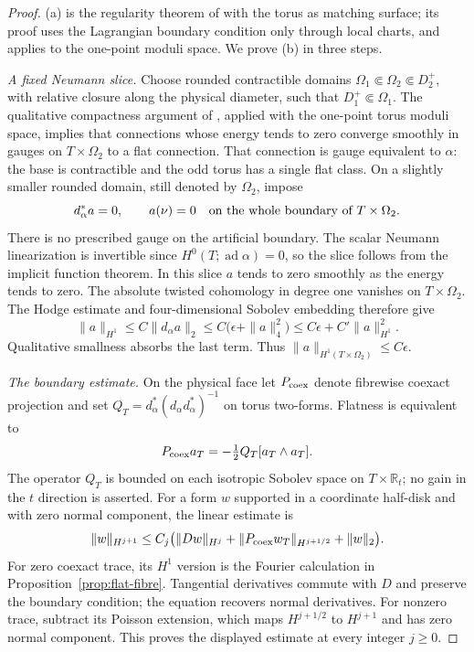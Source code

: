 \documentclass[11pt]{amsart}
\theoremstyle{definition}
\theoremstyle{remark}
\theoremstyle{plain}
\numberwithin{equation}{section}
\newcommand{\RR}{\mathbb{R}}
\newcommand{\ad}{\operatorname{ad}}
\begin{document}
\begin{proof}
(a) is the regularity theorem of \cite[Theorem~1]{DFL-mixed} with the torus as
matching surface; its proof uses the Lagrangian boundary condition only through
local charts, and applies to the one-point moduli space. We prove (b) in three steps.

\emph{A fixed Neumann slice.} Choose rounded contractible domains
$\Omega_1\Subset\Omega_2\Subset D^+_2$, with relative closure along
the physical diameter, such that $D^+_1\Subset\Omega_1$.
The qualitative compactness argument of
\cite[Theorem~4.2, Lemma~4.25 and pp.~38--39]{DFL-mixed}, applied
with the one-point torus moduli space, implies that connections
whose energy tends to zero converge smoothly in gauges on
$T\times\Omega_2$ to a flat connection. That connection is gauge
equivalent to $\alpha$: the base is contractible and the odd torus
has a single flat class. On a slightly smaller rounded domain,
still denoted by $\Omega_2$, impose
\[
d_\alpha^*a=0,\qquad a(\nu)=0
       \quad\hbox{on the whole boundary of }T\times\Omega_2.
\]
There is no prescribed gauge on the artificial boundary. The scalar
Neumann linearization is invertible since $H^0(T;\ad\alpha)=0$,
so the slice follows from the implicit function theorem. In this
slice $a$ tends to zero smoothly as the energy tends to zero.
The absolute twisted cohomology in degree one vanishes on
$T\times\Omega_2$. The Hodge estimate and four-dimensional
Sobolev embedding therefore give
\[
\|a\|_{H^1}\le C\|d_\alpha a\|_2
 \le C\bigl(\epsilon+\|a\|_4^2\bigr)
 \le C\epsilon+C'\|a\|_{H^1}^2.
\]
Qualitative smallness absorbs the last term. Thus
$\|a\|_{H^1(T\times\Omega_2)}\le C\epsilon$.

\emph{The boundary estimate.} On the physical face let
$P_{\rm coex}$ denote fibrewise coexact projection and set
$Q_T=d_\alpha^*(d_\alpha d_\alpha^*)^{-1}$ on torus two-forms.
Flatness is equivalent to
\[
P_{\rm coex}a_T=-\tfrac12Q_T[a_T\wedge a_T].
\]
The operator $Q_T$ is bounded on each isotropic Sobolev space
on $T\times\RR_t$; no gain in the $t$ direction is asserted.
For a form $w$ supported in a coordinate half-disk and with zero
normal component, the linear estimate is
\[
\|w\|_{H^{j+1}}\le C_j\bigl(\|Dw\|_{H^j}
 +\|P_{\rm coex}w_T\|_{H^{j+1/2}}+\|w\|_2\bigr).
\]
For zero coexact trace, its $H^1$ version is the Fourier calculation
in Proposition~\ref{prop:flat-fibre}. Tangential derivatives commute
with $D$ and preserve the boundary condition; the equation recovers
normal derivatives. For nonzero trace, subtract its Poisson extension,
which maps $H^{j+1/2}$ to $H^{j+1}$ and has zero normal component.
This proves the displayed estimate at every integer $j\ge0$.


\end{proof}
\end{document}
